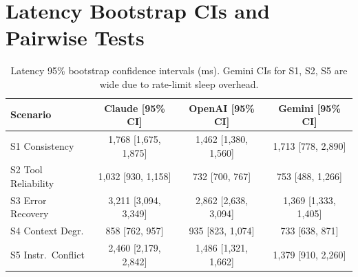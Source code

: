 \documentclass[11pt]{article}
\begin{document}
\section{Latency Bootstrap CIs and Pairwise Tests}

\begin{table}[ht]
\centering
\small
\begin{tabular}{lccc}
\toprule
\textbf{Scenario} & \textbf{Claude [95\% CI]} & \textbf{OpenAI [95\% CI]} & \textbf{Gemini [95\% CI]} \\
\midrule
S1 Consistency & 1{,}768 [1{,}675, 1{,}875] & 1{,}462 [1{,}380, 1{,}560] & 1{,}713 [778, 2{,}890] \\
S2 Tool Reliability & 1{,}032 [930, 1{,}158] & 732 [700, 767] & 753 [488, 1{,}266] \\
S3 Error Recovery & 3{,}211 [3{,}094, 3{,}349] & 2{,}862 [2{,}638, 3{,}094] & 1{,}369 [1{,}333, 1{,}405] \\
S4 Context Degr. & 858 [762, 957] & 935 [823, 1{,}074] & 733 [638, 871] \\
S5 Instr.\ Conflict & 2{,}460 [2{,}179, 2{,}842] & 1{,}486 [1{,}321, 1{,}662] & 1{,}379 [910, 2{,}260] \\
\bottomrule
\end{tabular}
\caption{Latency 95\% bootstrap confidence intervals (ms). Gemini CIs for S1, S2, S5 are wide due to rate-limit sleep overhead.}
\end{table}
\end{document}
